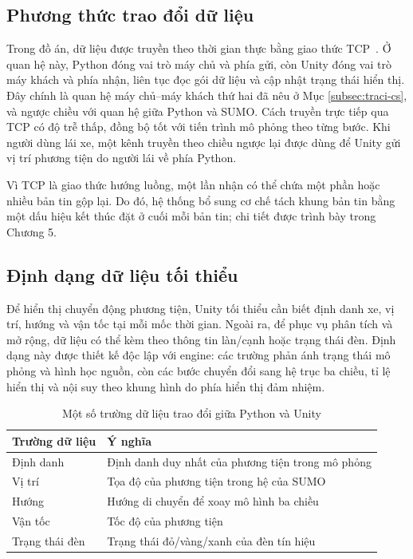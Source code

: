 ﻿\documentclass[../DoAn.tex]{subfiles}
\begin{document}
\subsection{Phương thức trao đổi dữ liệu}
\label{subsec:trao-doi-du-lieu}

Trong đồ án, dữ liệu được truyền theo thời gian thực bằng giao thức TCP~\cite{rfc793}. Ở quan hệ
này, Python đóng vai trò máy chủ và phía gửi, còn Unity đóng vai trò máy khách và
phía nhận, liên tục đọc gói dữ liệu và cập nhật trạng thái hiển thị. Đây chính là
quan hệ máy chủ--máy khách thứ hai đã nêu ở Mục \ref{subsec:traci-cs}, và ngược
chiều với quan hệ giữa Python và \gls{SUMO}. Cách truyền trực tiếp qua TCP
có độ trễ thấp, đồng bộ tốt với tiến trình mô phỏng theo từng bước. Khi người dùng
lái xe, một kênh truyền theo chiều ngược lại được dùng để Unity gửi vị trí phương
tiện do người lái về phía Python.

Vì TCP là giao thức hướng luồng, một lần nhận có thể chứa một phần hoặc nhiều bản
tin gộp lại. Do đó, hệ thống bổ sung cơ chế tách khung bản tin bằng một dấu hiệu
kết thúc đặt ở cuối mỗi bản tin; chi tiết được trình bày trong Chương 5.

\subsection{Định dạng dữ liệu tối thiểu}

Để hiển thị chuyển động phương tiện, Unity tối thiểu cần biết định danh xe, vị
trí, hướng và vận tốc tại mỗi mốc thời gian. Ngoài ra, để phục vụ phân tích và mở
rộng, dữ liệu có thể kèm theo thông tin làn/cạnh hoặc trạng thái đèn. Định dạng
này được thiết kế độc lập với engine: các trường phản ánh trạng thái mô phỏng và
hình học nguồn, còn các bước chuyển đổi sang hệ trục ba chiều, tỉ lệ hiển thị và
nội suy theo khung hình do phía hiển thị đảm nhiệm.

\begin{table}[htbp]
	\centering
	\caption{Một số trường dữ liệu trao đổi giữa Python và Unity}
	\label{tab:data-schema}
	\begin{tabular}{|p{}|p{}|}
		\hline
		\textbf{Trường dữ liệu} & \textbf{Ý nghĩa} \\
		\hline
		Định danh & Định danh duy nhất của phương tiện trong mô phỏng \\ \hline
		Vị trí & Tọa độ của phương tiện trong hệ của \gls{SUMO} \\ \hline
		Hướng & Hướng di chuyển để xoay mô hình ba chiều \\ \hline
		Vận tốc & Tốc độ của phương tiện \\ \hline
		Trạng thái đèn & Trạng thái đỏ/vàng/xanh của đèn tín hiệu \\
		\hline
	\end{tabular}
\end{table}
\end{document}
